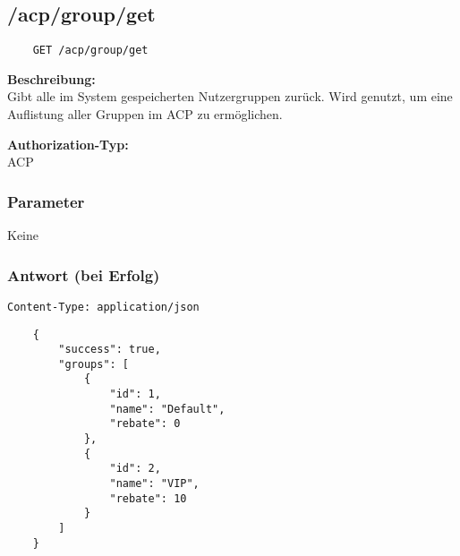 \subsection{/acp/group/get}

\begin{lstlisting}
    GET /acp/group/get
\end{lstlisting}

\textbf{Beschreibung:} \\
Gibt alle im System gespeicherten Nutzergruppen zurück. Wird genutzt, um eine Auflistung aller Gruppen im ACP zu ermöglichen.

\textbf{Authorization-Typ:} \\
ACP

\subsubsection{Parameter}
Keine

\subsubsection{Antwort (bei Erfolg)}

\lstinline{Content-Type: application/json}
\begin{lstlisting}
    {
        "success": true, 
        "groups": [
            {
                "id": 1,
                "name": "Default",
                "rebate": 0
            },
            {
                "id": 2,
                "name": "VIP",
                "rebate": 10
            }
        ]
    }
\end{lstlisting}
